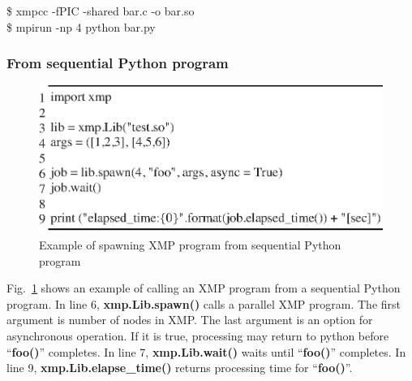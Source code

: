 \documentclass[graybox]{svmult}
\begin{document}
\begin{svgraybox}
\$ xmpcc -fPIC -shared bar.c -o bar.so\\
\$ mpirun -np 4 python bar.py
\end{svgraybox}

\subsubsection{From sequential Python program}
\begin{figure}[h]
\sidecaption
\includegraphics[scale=.82]{img/program6.eps}
\caption{Example of spawning XMP program from sequential Python program\cite{pgas-ei}} \label{fig:program6}
\end{figure}


Fig.~\ref{fig:program6} shows an example of calling an XMP program from a sequential Python program.
In line 6, {\bf xmp.Lib.spawn()} calls a parallel XMP program.
The first argument is number of nodes in XMP.
The last argument is an option for asynchronous operation.
If it is true,  processing may return to python before ``{\bf foo()}'' completes.
In line 7, {\bf xmp.Lib.wait()} waits until ``{\bf foo()}'' completes.
In line 9, {\bf xmp.Lib.elapse\_time()} returns  processing time for ``{\bf foo()}''.
\end{document}
